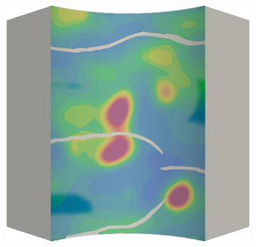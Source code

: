 \begin{figure}[!htbp]
\begin{subfigure}{0.19\textwidth}
  \end{subfigure}
  \hspace{0.06\textwidth}
  \begin{subfigure}{0.19\textwidth}
    \centering
    \includegraphics[width=\textwidth]{Chapter5/figures/spallation/ep.0033}
  \end{subfigure}
  

\end{figure}
